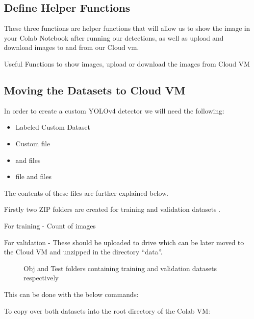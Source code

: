 \subsection{Define Helper Functions}
These three functions are helper functions that will allow us to show the image in your Colab Notebook after running our detections, as well as upload and download images to and from our Cloud \ac{vm}.

\begin{code}[H]
	
	\caption{Useful Functions to show images, upload or download the images from Cloud VM} \label{TensorFlow:Complete}
\end{code}

\subsection{Moving the Datasets to Cloud VM}

In order to create a custom YOLOv4 detector we will need the following:
\begin{itemize}
	\item Labeled Custom Dataset
	\item Custom file  
	\item {} and  files 
	\item {} file and  files
\end{itemize}
The contents of these files are further explained below.

Firstly two ZIP folders are created for training  and validation datasets . 

For training - Count of images

For validation - 
These should be uploaded to drive which can be later moved to the Cloud VM and unzipped in the directory ``data''.

\begin{figure}[H]
	\centering
	\caption{Obj and Test folders containing training and validation datasets respectively}
\end{figure}

This can be done with the below commands: 

To copy over both datasets into the root directory of the Colab VM:


